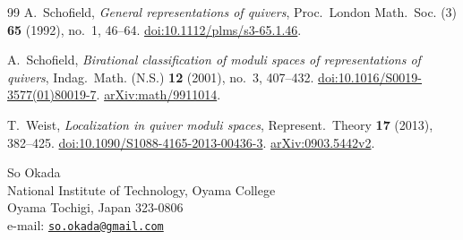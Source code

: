\documentclass[11pt,a4paper]{article}
\numberwithin{equation}{section}
\theoremstyle{definition}
\theoremstyle{remark}
\begin{document}
\begin{thebibliography}{99}
A.~Schofield, \emph{General representations of quivers},
Proc.~London Math.~Soc. (3) \textbf{65} (1992), no.~1, 46--64.
\href{https://doi.org/10.1112/plms/s3-65.1.46}{doi:10.1112/plms/s3-65.1.46}.

A.~Schofield, \emph{Birational classification of moduli spaces of
representations of quivers},
Indag.~Math. (N.S.) \textbf{12} (2001), no.~3, 407--432.
\href{https://doi.org/10.1016/S0019-3577(01)80019-7}{doi:10.1016/S0019-3577(01)80019-7}.
\href{https://arxiv.org/abs/math/9911014}{arXiv:math/9911014}.

T.~Weist, \emph{Localization in quiver moduli spaces},
Represent.~Theory \textbf{17} (2013), 382--425.
\href{https://doi.org/10.1090/S1088-4165-2013-00436-3}{doi:10.1090/S1088-4165-2013-00436-3}.
\href{https://arxiv.org/abs/0903.5442v2}{arXiv:0903.5442v2}.
\end{thebibliography}

\bigskip
\noindent
So Okada\\
National Institute of Technology, Oyama College\\
Oyama Tochigi, Japan 323-0806\\
e-mail: \href{mailto:so.okada@gmail.com}{\nolinkurl{so.okada@gmail.com}}
\end{document}
